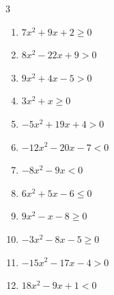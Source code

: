 \begin{multicols}{3}
\begin{enumerate}
\columnbreak %

  \item $7x^{2}+9x+2\geq 0$


  \item $8x^{2}-22x+9>0$


  \item $9x^{2}+4x-5>0$


  \item $3x^{2}+x\geq 0$


  \item $-5x^{2}+19x+4>0$


  \item $-12x^{2}-20x-7<0$


  \item $-8x^{2}-9x<0$


  \item $6x^{2}+5x-6\leq 0$


  \item $9x^{2}-x-8\geq 0$


  \item $-3x^{2}-8x-5\geq 0$


\columnbreak %

\resetques

  \item $-15x^{2}-17x-4>0$


  \item $18x^{2}-9x+1<0$


\end{enumerate}
\end{multicols}
